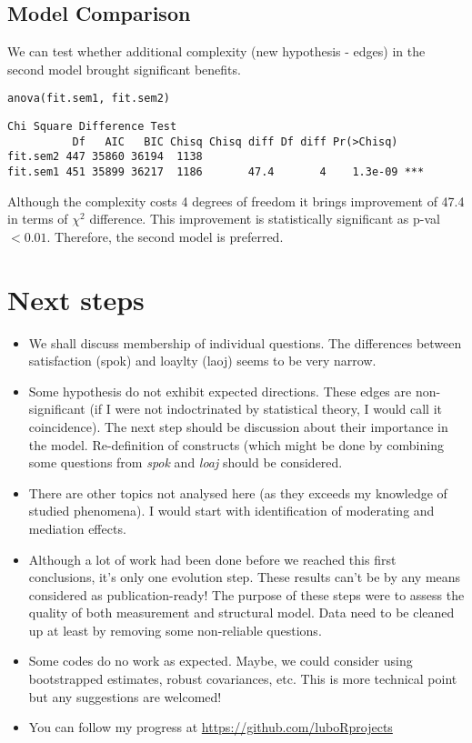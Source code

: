 \documentclass[10pt,a4paper]{article}
\begin{document}
\subsection{Model Comparison}
We can test whether additional complexity (new hypothesis - edges) in the second model brought significant benefits. 
\begin{lstlisting}
anova(fit.sem1, fit.sem2)
\end{lstlisting}
\begin{verbatim}
Chi Square Difference Test
          Df   AIC   BIC Chisq Chisq diff Df diff Pr(>Chisq)    
fit.sem2 447 35860 36194  1138                                  
fit.sem1 451 35899 36217  1186       47.4       4    1.3e-09 ***
\end{verbatim}

Although the complexity costs 4 degrees of freedom it brings improvement of 47.4 in terms of $\chi^2$ difference. This improvement is statistically significant as p-val $<0.01$. Therefore, the second model is preferred. 

\section{Next steps}
\begin{itemize}
\item We shall discuss membership of individual questions. The differences between satisfaction (spok) and loaylty (laoj) seems to be very narrow.
\item Some hypothesis do not exhibit expected directions. These edges are non-significant (if I were not indoctrinated by statistical theory, I would call it coincidence). The next step should be discussion about their importance in the model. Re-definition of constructs (which might be done by combining some questions from \emph{spok} and \emph{loaj} should be considered.
\item There are other topics not analysed here (as they exceeds my knowledge of studied phenomena). I would start with identification of moderating and mediation effects. 
\item Although a lot of work had been done before we reached this first conclusions, it's only one evolution step. These results can't be by any means considered as publication-ready! The purpose of these steps were to assess the quality of both measurement and structural model. Data need to be cleaned up at least by removing some non-reliable questions. 
\item Some codes do no work as expected. Maybe, we could consider using bootstrapped estimates, robust covariances, etc. This is more technical point but any suggestions are welcomed!
\item You can follow my progress at \url{https://github.com/luboRprojects}

\end{itemize}
\end{document}
